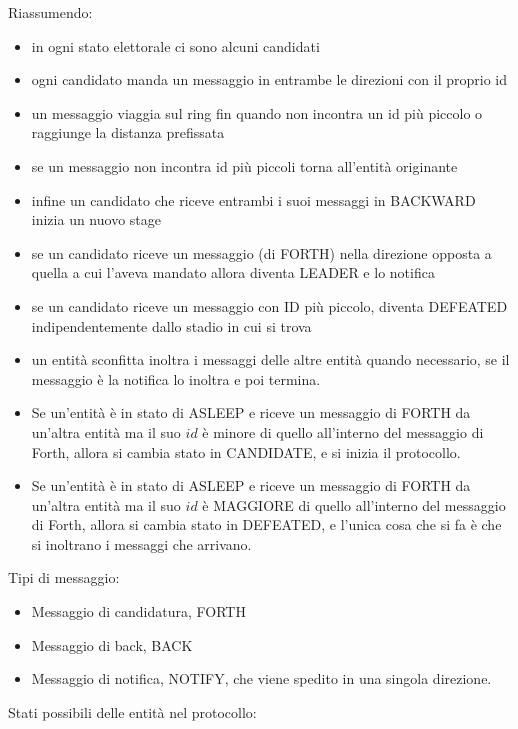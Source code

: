 Riassumendo:
\begin{itemize}
    \item in ogni stato elettorale ci sono alcuni candidati
    \item ogni candidato manda un messaggio in entrambe le direzioni con il
          proprio id
    \item un messaggio viaggia sul ring fin quando non incontra un id più piccolo
          o raggiunge la distanza prefissata
    \item se un messaggio non incontra id più piccoli torna all'entità originante
    \item infine un candidato che riceve entrambi i suoi messaggi in BACKWARD
          inizia un nuovo stage
    \item se un candidato riceve un messaggio (di FORTH) nella direzione opposta a
          quella a cui l'aveva mandato allora diventa LEADER e lo notifica
    \item se un candidato riceve un messaggio con ID più piccolo, diventa DEFEATED
          indipendentemente dallo stadio in cui si trova
    \item un entità sconfitta inoltra i messaggi delle altre entità quando
          necessario, se il messaggio è la notifica lo inoltra e poi termina.
    \item Se un'entità è in stato di ASLEEP e riceve un messaggio di FORTH da
          un'altra entità ma il suo $id$ è minore di quello all'interno del messaggio di
          Forth, allora si cambia stato in CANDIDATE, e si inizia il protocollo.
    \item Se un'entità è in stato di ASLEEP e riceve un messaggio di FORTH da
          un'altra entità ma il suo $id$ è MAGGIORE di quello all'interno del messaggio
          di Forth, allora si cambia stato in DEFEATED, e l'unica cosa che si fa è che si
          inoltrano i messaggi che arrivano.

\end{itemize}

Tipi di messaggio:
\begin{itemize}
    \item Messaggio di candidatura, FORTH
    \item Messaggio di back, BACK
    \item Messaggio di notifica, NOTIFY, che viene spedito in una singola
          direzione.
\end{itemize}

Stati possibili delle entità nel protocollo:

